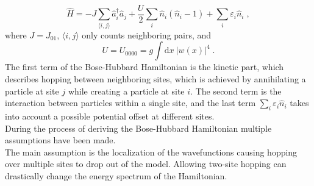 \begin{equation}
	\hat{H} = - J \sum_{\langle i,j \rangle} \hat{a}_{i}^{\dag} \hat{a}_{j} + \frac{U}{2} \sum_{i} \hat{n}_i \left( \hat{n}_i -1 \right) + \sum_{i} \varepsilon_i \hat{n}_i \; ,
	\label{BHhamil}
\end{equation}
where $J = J_{0 1}$, $\langle i,j \rangle$ only counts neighboring pairs, and
\begin{equation}
	U = U_{0 0 0 0} = g \int \mathrm{d}x \ |w(x)|^4 \; .
\end{equation}
The first term of the Bose-Hubbard Hamiltonian is the kinetic part, which describes hopping between neighboring sites, which is achieved by annihilating a particle at site $j$ while creating a particle at site $i$. The second term is the interaction between particles within a single site, and the last term $\sum_{i} \varepsilon_i \hat{n}_i$ takes into account a possible potential offset at different sites.
\\
During the process of deriving the Bose-Hubbard Hamiltonian multiple assumptions have been made.\\
The main assumption is the localization of the wavefunctions causing hopping over multiple sites to drop out of the model. Allowing two-site hopping can drastically change the energy spectrum of the Hamiltonian.